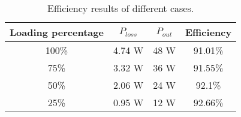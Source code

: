 \begin{table}[H]
    \centering
    \caption{Efficiency results of different cases.}
    \label{tab:eff}
    \begin{tabular}{|c|c|c|c|}
        \hline
        Loading percentage  & $P_{loss}$    & $P_{out}$ & Efficiency    \\
        \hline\hline
        100\%               & 4.74 W        & 48 W      & 91.01\%       \\
        \hline
        75\%                & 3.32 W        & 36 W      & 91.55\%       \\
        \hline
        50\%                & 2.06 W        & 24 W      & 92.1\%        \\
        \hline
        25\%                & 0.95 W        & 12 W      & 92.66\%       \\
        \hline
    \end{tabular}
\end{table}